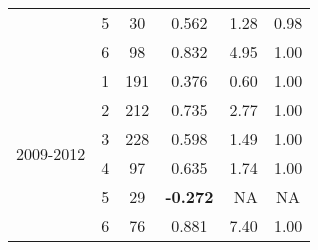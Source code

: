 \begin{table}[htbp]
\begin{tabular}{rrcrrr}
    \multicolumn{1}{c}{} & \multicolumn{1}{c}{5} & \multicolumn{1}{c}{30} & \multicolumn{1}{c}{0.562 } & \multicolumn{1}{r}{1.28 } & \multicolumn{1}{c}{0.98 } \\
    \multicolumn{1}{c}{} & \multicolumn{1}{c}{6} & \multicolumn{1}{c}{98} & \multicolumn{1}{c}{0.832 } & \multicolumn{1}{r}{4.95 } & \multicolumn{1}{c}{1.00 } \\\midrule
    \multicolumn{1}{c}{\multirow{6}[2]{*}{\begin{sideways}2009-2012\end{sideways}}} & \multicolumn{1}{c}{1} & \multicolumn{1}{c}{191} & \multicolumn{1}{c}{0.376 } & \multicolumn{1}{r}{0.60 } & \multicolumn{1}{c}{1.00 } \\
    \multicolumn{1}{c}{} & \multicolumn{1}{c}{2} & \multicolumn{1}{c}{212} & \multicolumn{1}{c}{0.735 } & \multicolumn{1}{r}{2.77 } & \multicolumn{1}{c}{1.00 } \\
    \multicolumn{1}{c}{} & \multicolumn{1}{c}{3} & \multicolumn{1}{c}{228} & \multicolumn{1}{c}{0.598 } & \multicolumn{1}{r}{1.49 } & \multicolumn{1}{c}{1.00 } \\
    \multicolumn{1}{c}{} & \multicolumn{1}{c}{4} & \multicolumn{1}{c}{97} & \multicolumn{1}{c}{0.635 } & \multicolumn{1}{r}{1.74 } & \multicolumn{1}{c}{1.00 } \\
    \multicolumn{1}{c}{} & \multicolumn{1}{c}{5} & \multicolumn{1}{c}{29} & \multicolumn{1}{c}{\textbf{-0.272 }} & \multicolumn{1}{r}{NA} & \multicolumn{1}{c}{NA} \\
    \multicolumn{1}{c}{} & \multicolumn{1}{c}{6} & \multicolumn{1}{c}{76} & \multicolumn{1}{c}{0.881 } & \multicolumn{1}{r}{7.40 } & \multicolumn{1}{c}{1.00 } \\
    \bottomrule
    \end{tabular}%
  \label{tab:NO3SWPHPA}%
\end{table}%
